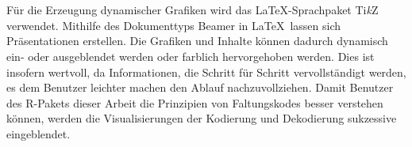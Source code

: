 \\
\\
Für die Erzeugung dynamischer Grafiken wird das \LaTeX -Sprachpaket Ti\textit{k}Z verwendet. Mithilfe des Dokumenttyps Beamer in \LaTeX\ lassen sich Präsentationen erstellen. Die Grafiken und Inhalte können dadurch dynamisch ein- oder ausgeblendet werden oder farblich hervorgehoben werden. Dies ist insofern wertvoll, da Informationen, die Schritt für Schritt vervollständigt werden, es dem Benutzer leichter machen den Ablauf nachzuvollziehen. Damit Benutzer des R-Pakets dieser Arbeit die Prinzipien von Faltungskodes besser verstehen können, werden die Visualisierungen der Kodierung und Dekodierung sukzessive eingeblendet.